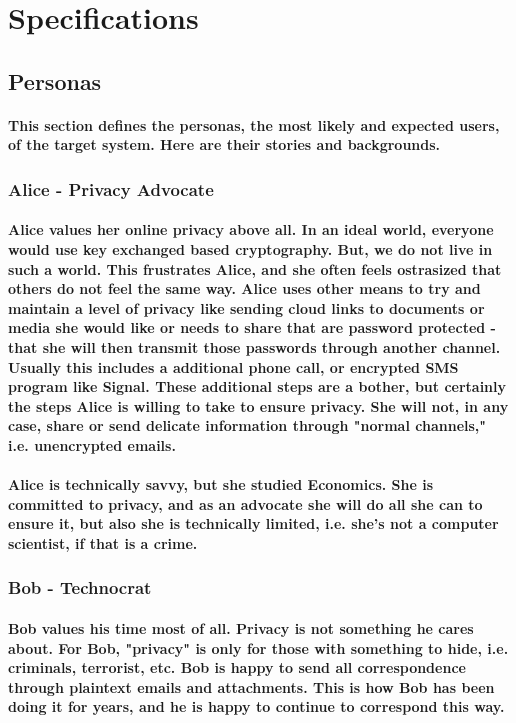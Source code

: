 \section{Specifications}
\subsection{Personas}
\paragraph{This section defines the personas, the most likely and expected users, of the target system. Here are their stories and backgrounds.}

\subsubsection{Alice - Privacy Advocate}

\paragraph{Alice values her online privacy above all. In an ideal world, everyone would use key exchanged based cryptography. But, we do not live in such a world. This frustrates Alice, and she often feels ostrasized that others do not feel the same way. Alice uses other means to try and maintain a level of privacy like sending cloud links to documents or media she would like or needs to share that are password protected - that she will then transmit those passwords through another channel. Usually this includes a additional phone call, or encrypted SMS program like Signal. These additional steps are a bother, but certainly the steps Alice is willing to take to ensure privacy. She will not, in any case, share or send delicate information through "normal channels," i.e. unencrypted emails.}
\paragraph{Alice is technically savvy, but she studied Economics. She is committed to privacy, and as an advocate she will do all she can to ensure it, but also she is technically limited, i.e. she's not a computer scientist, if that is a crime.}

\subsubsection{Bob - Technocrat}

\paragraph{Bob values his time most of all. Privacy is not something he cares about. For Bob, "privacy" is only for those with something to hide, i.e. criminals, terrorist, etc. Bob is happy to send all correspondence through plaintext emails and attachments. This is how Bob has been doing it for years, and he is happy to continue to correspond this way.}

